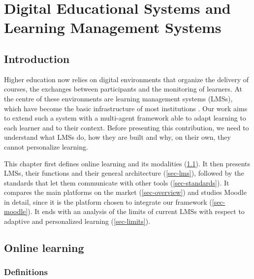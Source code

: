 \chapter{Digital Educational Systems and Learning Management Systems}
\label{chap-lms}

\section*{Introduction}

Higher education now relies on digital environments that organize the
delivery of courses, the exchanges between participants and the monitoring
of learners. At the centre of these environments are learning management
systems (LMSs), which have become the basic infrastructure of most
institutions \cite{dahlstrom2014,coates2005}. Our work aims to extend such
a system with a multi-agent framework able to adapt learning to each
learner and to their context. Before presenting this contribution, we need
to understand what LMSs do, how they are built and why, on their own, they
cannot personalize learning.

This chapter first defines online learning and its modalities
(\cref{sec-elearning}). It then presents LMSs, their functions and their
general architecture (\cref{sec-lms}), followed by the standards that let
them communicate with other tools (\cref{sec-standards}). It compares the
main platforms on the market (\cref{sec-overview}) and studies Moodle in
detail, since it is the platform chosen to integrate our framework
(\cref{sec-moodle}). It ends with an analysis of the limits of current
LMSs with respect to adaptive and personalized learning
(\cref{sec-limits}).

\section{Online learning}
\label{sec-elearning}

\subsection{Definitions}

